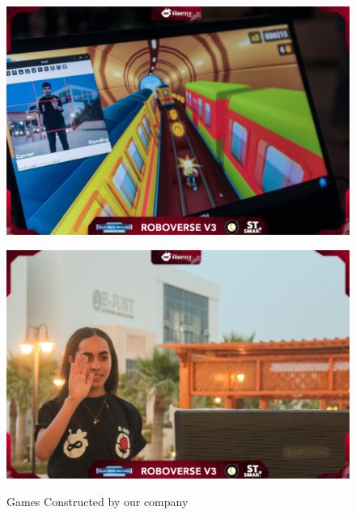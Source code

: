 \documentclass[11pt, twocolumn]{article}
\begin{document}
\begin{figure}[h]
    \centering
    \begin{minipage}{0.48\textwidth}
        \centering
        \includegraphics[width=\textwidth]{Images/Entertaining games.jpg}
        
        \label{fig:figure1}
    \end{minipage}
    \hfill
    \begin{minipage}{0.48\textwidth}
        \centering
        \includegraphics[width=\textwidth]{Images/Entertaining two.jpg}
      
        \label{fig:figure2}
    \end{minipage}
    \caption{Games Constructed by our company }
    \label{fig:both_figures}
\end{figure}
\end{document}
